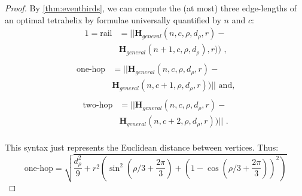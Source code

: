 \documentclass[twocolumn,10pt]{asme2ej}
\renewcommand{\vec}[1]{\mathbf{#1}}
\begin{document}
\begin{proof}
By \cref{thm:eventhirds}, we can compute the (at most) three edge-lengths of an optimal
tetrahelix by formulae universally quantified by $n$ and $c$:
\begin{equation}
  \begin{split}
  1 = \text{rail} &= || \vec{H}_{general}(n,c,\rho,d_{\rho},r)  - \\
  &  \vec{H}_{general}(n+1,c,\rho,d_{\rho}),r))  \text{ ,} \\
  \end{split}
\end{equation}
\begin{equation}
  \begin{split}  
  \text{one-hop} &= || \vec{H}_{general}(n,c,\rho,d_{\rho},r)  - \\
  &  \vec{H}_{general}(n,c+1,\rho,d_{\rho},r)) || \text{ and,} \\
  \end{split}  
\end{equation}  
  \begin{equation}
  \begin{split}    
  \text{two-hop} &= || \vec{H}_{general}(n,c,\rho,d_{\rho},r)  - \\
  &  \vec{H}_{general}(n,c+2,\rho,d_{\rho},r)) || \text{ .}\\
  \end{split}  
\end{equation}  

This syntax just represents the Euclidean distance between vertices. Thus:
\begin{equation}
  \text{one-hop}  = \sqrt{\frac{d_{\rho}^2}{9} + r^2(\sin^2(\rho/3 + \frac{2\pi}{3})  + (1 - \cos(\rho/3 + \frac{2\pi}{3}))^2)} 
\end{equation}


\end{proof}
\end{document}

